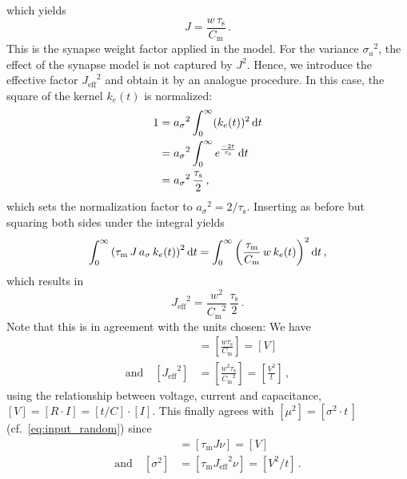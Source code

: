 which yields 
\begin{equation}
    J = \frac{w \, \tau_\text{s}}{C_\text{m}} \,.
    \label{eq:J_eff}
\end{equation}
This is the synapse weight factor applied in the model.
For the variance ${\sigma_a}^2$, the effect of the synapse model is not captured by $J^2$. 
Hence, we introduce the effective factor ${J_\text{eff}}^2$ and obtain it by an 
analogue procedure.
In this case, the square of the kernel $k_e(t)$ is normalized:%
\begin{equation}
    \begin{split}
        1   &= {a_\sigma}^2 \int_{0}^{\infty}(k_e(t))^2\mathop{}\!\text{d} t  \\
            &= {a_\sigma}^2 \int_{0}^{\infty} e^{\frac{-2t}{\tau_\text{s} }} \mathop{}\!\text{d} t  \\
            &= {a_\sigma}^2 \, \frac{\tau_\text{s} }{2}\,,
    \end{split}
    \label{eq:match_k_e_sq}
\end{equation}
which sets the normalization factor to ${a_\sigma}^2 = 2 / \tau_\text{s} $.
Inserting as before but squaring both sides under the integral yields
\begin{equation}
    \int_{0}^{\infty} \left(\tau_\text{m} \,J \,a_\sigma\, k_e(t)\right)^2 \mathop{}\!\text{d} t 
        = \int_{0}^{\infty} \left(\frac{\tau_\text{m} }{C_\text{m}} \,w\, k_e(t)\right)^2\mathop{}\!\text{d} t \,,
    \label{eq:match_syns}
\end{equation}
which results in 
\begin{equation}
    {J_\text{eff}}^2 =  \frac{w^2}{{C_\text{m}}^2} \,\frac{\tau_\text{s} }{2}  \, .
    \label{eq:J_eff}
\end{equation}
Note that this is in agreement with the units chosen: We have
\begin{align}
    [J] 
        &=  \left[ \frac{w \tau_\text{s} }{C_\text{m}}\right] 
        = [V] \\
    \text{and}\quad 
    \left[ {J_\text{eff}}^2  \right] 
        &=  \left[ \frac{w^2 \tau_\text{s}}{{C_\text{m}}^2} \right] 
    = \left[ \frac{V^2}{t} \right] \,,
    \label{eq:units}
\end{align}
using the relationship between voltage, current and capacitance, $[V] = [R\cdot I] = [t / C]\cdot[I]$.
This finally agrees with $[\mu^2] = [\sigma^2 \cdot t\,]$ (cf.~\autoref{eq:input_random}) since
\begin{align}   
    [\mu] &= [\tau_\text{m} J \nu] = [V] \\
    \text{and}\quad 
    [\sigma^2] &= [\tau_\text{m} {J_\text{eff}}^2  \nu] = [V^2 / t]  \,.
    \label{eq:units_res}
\end{align}

